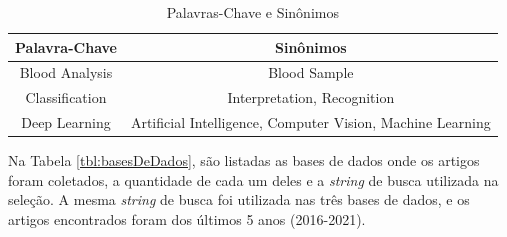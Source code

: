 \begin{table}[!htb]
	\centering
	\caption{Palavras-Chave e Sinônimos}
	\label{tbl:palavrasChave}
	\begin{tabular}{|c|c|}
		\hline
		\textbf{Palavra-Chave} & \textbf{Sinônimos}                                        \\ \hline
		Blood Analysis         & Blood Sample                                               \\ \hline
		Classification         & Interpretation, Recognition                                \\ \hline
		Deep Learning          & Artificial Intelligence, Computer Vision, Machine Learning \\ \hline
	\end{tabular}
	\vspace{6pt}
\end{table}

Na Tabela \ref{tbl:basesDeDados}, são listadas as bases de dados onde os artigos foram coletados, a quantidade de cada um deles e a \emph{string} de busca utilizada na seleção. A mesma \emph{string} de busca foi utilizada nas três bases de dados, e os artigos encontrados foram dos últimos 5 anos (2016-2021).

